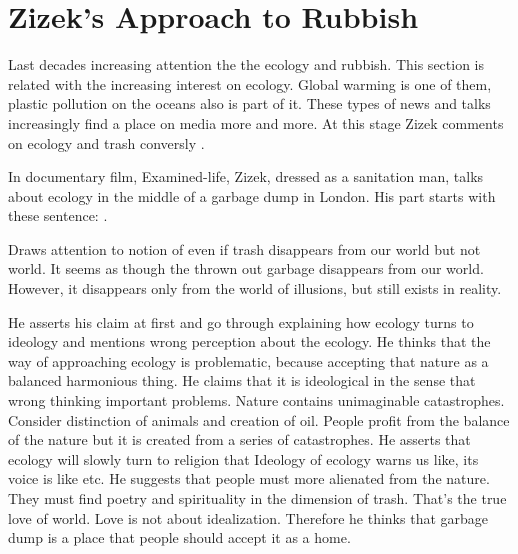 %
%
\section{Zizek's Approach to Rubbish}
Last decades increasing attention the the ecology and rubbish. This section is related with the increasing interest on ecology. Global warming is one of them, plastic pollution on the oceans also is part of it. These types of news and talks increasingly find a place on media more and more. At this stage Zizek comments on ecology and trash conversly .


In documentary film, Examined-life, Zizek, dressed as a sanitation man, talks about ecology in the middle of a garbage dump in London. His part starts with these sentence: . 

Draws attention to notion of even if trash disappears from our world but not world. It seems as though the thrown out garbage disappears from our world. However, it disappears only from the world of illusions, but still exists in reality. 

He asserts his claim at first and go through explaining how ecology turns to ideology and mentions wrong perception about the ecology. He thinks that the way of approaching ecology is problematic, because accepting that nature as a balanced harmonious thing. He claims that it is ideological in the sense that wrong thinking important problems. Nature contains unimaginable catastrophes. Consider distinction of animals and creation of oil. People profit from the balance of the nature but it is created from a series of catastrophes. He asserts that ecology will slowly turn to religion that  Ideology of ecology warns us like,  its voice is like  etc. He suggests that people must more alienated from the nature. They must find poetry and spirituality in the dimension of trash. That's the true love of world. Love is not about idealization. Therefore he thinks that garbage dump is a place that people should accept it as a home.

